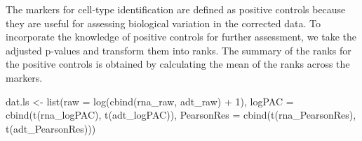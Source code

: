 \documentclass[]{article}
\newcommand{\hlnum}[1]{\textcolor[rgb]{0.816,0.125,0.439}{#1}}%
\newcommand{\hlstr}[1]{\textcolor[rgb]{0.251,0.627,0.251}{#1}}%
\newcommand{\hlstd}[1]{\textcolor[rgb]{0.251,0.251,0.251}{#1}}%
\newenvironment{Shaded}{\begin{myshaded}}{\end{myshaded}}
\newcommand{\DecValTok}[1]{\hlnum{#1}}
\newcommand{\SpecialCharTok}[1]{\hlstr{#1}}
\newcommand{\OtherTok}[1]{{#1}}
\newcommand{\FunctionTok}[1]{\hlstd{#1}}
\newcommand{\AttributeTok}[1]{{#1}}
\newcommand{\NormalTok}[1]{\hlstd{#1}}
\begin{document}
The markers for cell-type identification are defined as positive controls because they are useful for assessing biological variation in the corrected data. To incorporate the knowledge of positive controls for further assessment, we take the adjusted p-values and transform them into ranks. The summary of the ranks for the positive controls is obtained by calculating the mean of the ranks across the markers.

\begin{Shaded}
\begin{Highlighting}[]
\NormalTok{dat.ls }\OtherTok{\textless{}{-}} \FunctionTok{list}\NormalTok{(}\AttributeTok{raw =} \FunctionTok{log}\NormalTok{(}\FunctionTok{cbind}\NormalTok{(rna\_raw, adt\_raw) }\SpecialCharTok{+} \DecValTok{1}\NormalTok{), }\AttributeTok{logPAC =} \FunctionTok{cbind}\NormalTok{(}\FunctionTok{t}\NormalTok{(rna\_logPAC),}
    \FunctionTok{t}\NormalTok{(adt\_logPAC)), }\AttributeTok{PearsonRes =} \FunctionTok{cbind}\NormalTok{(}\FunctionTok{t}\NormalTok{(rna\_PearsonRes), }\FunctionTok{t}\NormalTok{(adt\_PearsonRes)))}


\end{Highlighting}
\end{Shaded}
\end{document}
